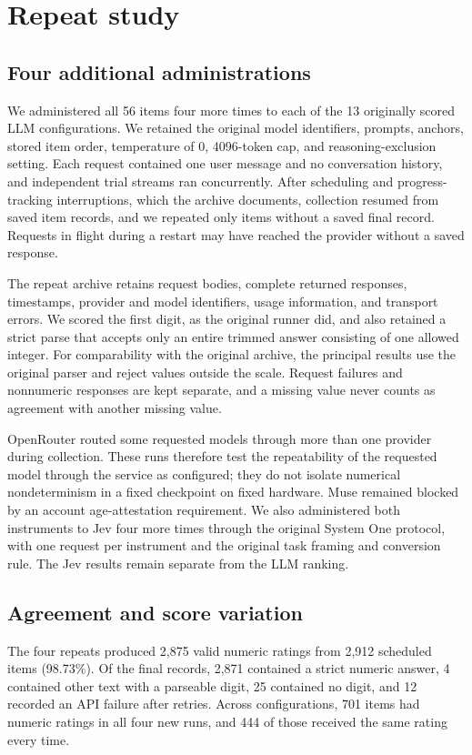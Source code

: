\documentclass[11pt]{article}
\begin{document}
\section{Repeat study}\label{sec:repeats}
\subsection{Four additional administrations}
We administered all 56 items four more times to each of the 13 originally scored LLM configurations. We retained the original model identifiers, prompts, anchors, stored item order, temperature of 0, 4096-token cap, and reasoning-exclusion setting. Each request contained one user message and no conversation history, and independent trial streams ran concurrently. After scheduling and progress-tracking interruptions, which the archive documents, collection resumed from saved item records, and we repeated only items without a saved final record. Requests in flight during a restart may have reached the provider without a saved response.

The repeat archive retains request bodies, complete returned responses, timestamps, provider and model identifiers, usage information, and transport errors. We scored the first digit, as the original runner did, and also retained a strict parse that accepts only an entire trimmed answer consisting of one allowed integer. For comparability with the original archive, the principal results use the original parser and reject values outside the scale. Request failures and nonnumeric responses are kept separate, and a missing value never counts as agreement with another missing value.

OpenRouter routed some requested models through more than one provider during collection. These runs therefore test the repeatability of the requested model through the service as configured; they do not isolate numerical nondeterminism in a fixed checkpoint on fixed hardware. Muse remained blocked by an account age-attestation requirement. We also administered both instruments to Jev four more times through the original System One protocol, with one request per instrument and the original task framing and conversion rule. The Jev results remain separate from the LLM ranking.

\subsection{Agreement and score variation}
The four repeats produced 2,875 valid numeric ratings from 2,912 scheduled items (98.73\%). Of the final records, 2,871 contained a strict numeric answer, 4 contained other text with a parseable digit, 25 contained no digit, and 12 recorded an API failure after retries. Across configurations, 701 items had numeric ratings in all four new runs, and 444 of those received the same rating every time.
\end{document}
